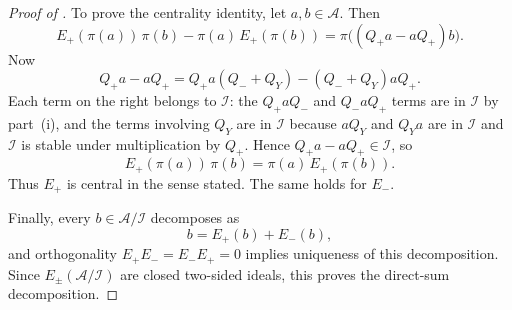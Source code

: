 \documentclass[11pt]{article}
\numberwithin{equation}{section}
\theoremstyle{definition}
\theoremstyle{remark}
\begin{document}
\begin{proof}[Proof of ]
To prove the centrality identity, let $a,b\in\mathcal A$. Then
\[
E_+(\pi(a))\,\pi(b)-\pi(a)\,E_+(\pi(b))
=
\pi\bigl((Q_+a-aQ_+)b\bigr).
\]
Now
\[
Q_+a-aQ_+
=
Q_+a(Q_-+Q_Y)-(Q_-+Q_Y)aQ_+.
\]
Each term on the right belongs to $\mathcal I$: the $Q_+aQ_-$ and $Q_-aQ_+$ terms are in
$\mathcal I$ by part~(i), and the terms involving $Q_Y$ are in $\mathcal I$ because $aQ_Y$ and
$Q_Ya$ are in $\mathcal I$ and $\mathcal I$ is stable under multiplication by $Q_+$. Hence
$Q_+a-aQ_+\in\mathcal I$, so
\[
E_+(\pi(a))\,\pi(b)=\pi(a)\,E_+(\pi(b)).
\]
Thus $E_+$ is central in the sense stated. The same holds for $E_-$.

Finally, every $b\in\mathcal A/\mathcal I$ decomposes as
\[
b=E_+(b)+E_-(b),
\]
and orthogonality $E_+E_-=E_-E_+=0$ implies uniqueness of this decomposition. Since
$E_\pm(\mathcal A/\mathcal I)$ are closed two-sided ideals, this proves the direct-sum decomposition.
\end{proof}
\end{document}
